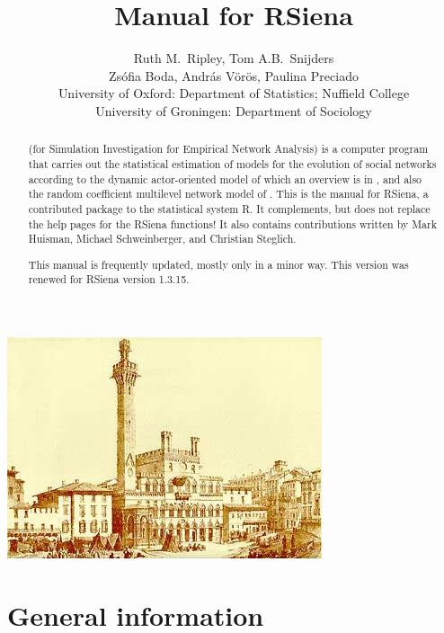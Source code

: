 \documentclass[a4paper,fleqn,11pt]{article}
\title{{\Huge Manual for \textsf{RSiena} } }
\author{\Large Ruth M.\ Ripley, Tom A.B.\ Snijders\\[1ex]
        \Large Zs\'{o}fia Boda, Andr\'{a}s V\"{o}r\"{o}s, Paulina Preciado  \\[4ex]
       {\large University of Oxford: Department of Statistics; Nuffield College}\\[1ex]
       {\large University of Groningen: Department of Sociology}\\[1ex]
    }
\newcommand{\+}{\, + \,}
\newcommand{\Rn}{{\sf R}}
\newcommand{\rs}{{\sf RSiena}}
\newcommand{\RS}{{\sf RSiena }}
\newcommand{\SI}{{\sf SIENA }}
\begin{document}

\maketitle

\vfill
\begin{center}
\includegraphics*[scale=3]{ilcampo.jpg}
\end{center}
\vfill

\begin{abstract}
\noindent \SI (for {\sf Simulation Investigation for Empirical
Network Analysis}) is a computer program that carries out the
statistical estimation of models for the evolution of social
networks according to the dynamic actor-oriented model of
which an overview is in \citet{Snijders2017},
and also the random coefficient multilevel network model of
\citet{KoskinenSnijders2022}.
This is the manual for \rs,
a contributed package to the statistical system \Rn.
It complements, but does not replace the help pages
for the \RS functions!
It also contains contributions written
by Mark Huisman, Michael Schweinberger, and Christian Steglich.

This manual is frequently updated, mostly only in a minor way.
This version was renewed for \RS version 1.3.15.
\end{abstract}




\vfill
\newpage
\tableofcontents
\newpage

\makeatletter
\def\@linkcolor{lc}
\makeatother


\section{General information}
\end{document}
